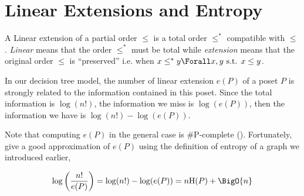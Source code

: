 \section{Linear Extensions and Entropy}

A Linear extension of a partial order $\leq$ is a total order $\leq^*$
compatible with $\leq$. \emph{Linear} means that the order $\leq^*$ must be
total while \emph{extension} means that the original order $\leq$ is
``preserved'' i.e. when $x \leq^* y \Forall x, y\text{ s.t. }x \leq y$.

In our decision tree model, the number of linear extension $e(P)$ of a poset
$P$ is strongly related to the information contained in this poset. Since the
total information is $\log(n!)$, the information we miss is $\log(e(P))$, then
the information we have is $\log(n!) - \log(e(P))$.


Note that computing $e(P)$ in the general case is \#P-complete
(\cite{brightwell1991counting}). Fortunately, \cite{kahn:1995} give a good
approximation of $e(P)$ using the definition of entropy of a graph we
introduced earlier,

\begin{equation}
\log\left(\frac{n!}{e(P)}\right) = \log(n!) - \log(e(P)) = n \text{H}(P) + \BigO{n}
\label{eq:khankim1}
\end{equation}
